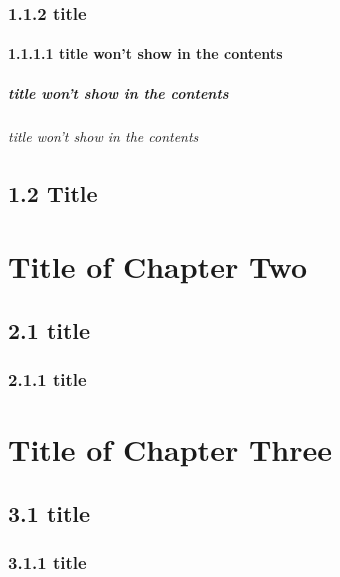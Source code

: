 \documentclass[a4paper,11pt,UTF8,openright]{book}
\begin{document}


\subsection{1.1.2 title}
\lipsum[1-3]

\subsubsection{1.1.1.1 title won't show in the contents}
\lipsum[1-3]

\paragraph{title won't show in the contents}
\lipsum[1-5]

\subparagraph{title won't show in the contents}
\lipsum[1-3]

\section{1.2 Title}
\lipsum[1-5]

\chapter{Title of Chapter Two}
\lipsum[1-3]

\section{2.1 title}
\lipsum[1-5]

\subsection{2.1.1 title}
\lipsum[1-5]

\chapter{Title of Chapter Three}
\lipsum[1-3]

\section{3.1 title}
\lipsum[1-5]

\subsection{3.1.1 title}
\lipsum[1-3]
\end{document}
